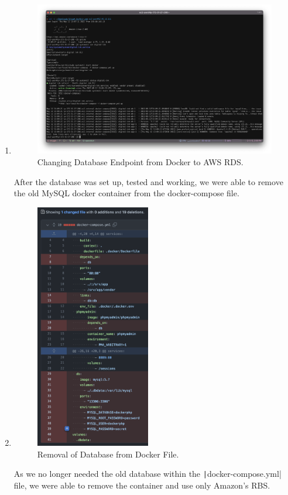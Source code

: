 \begin{enumerate}
    \item
    \begin{figure}[H]
        \centering
        \includegraphics[width=\textwidth]{resources/rds/envupdate}
        \caption{Changing Database Endpoint from Docker to AWS RDS.}
        \label{fig:rds-env-update}
    \end{figure}

    After the database was set up, tested and working, we were able to remove the old MySQL docker container from the
    docker-compose file.

    \item 
    \begin{figure}[H]
        \centering
        \includegraphics[width=50mm]{resources/rds/docker}
        \caption{Removal of Database from Docker File.}
        \label{fig:rds-rm-docker-compose}
    \end{figure}
    As we no longer needed the old database within the \texttt|docker-compose.yml| file, we were able to remove the container and use only Amazon's RBS.
\end{enumerate}